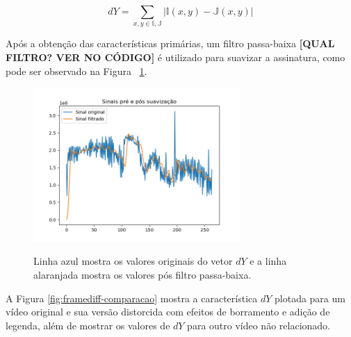 \begin{equation}
	\label{eq:framediff}
	dY = \sum_{x,y \in  \mathbb{I,J}} |\mathbb{I}(x,y) - \mathbb{J}(x,y)|
\end{equation} 

   Após a obtenção das características primárias, um filtro passa-baixa \textbf{[QUAL FILTRO? VER NO CÓDIGO]} é utilizado para suavizar a assinatura, como pode ser observado na Figura ~\ref{fig:framediff-passa-baixa}. %




\begin{figure}[h]
\centering
	\caption{Linha azul mostra os valores originais do vetor $dY$ e a linha alaranjada mostra os valores pós filtro passa-baixa.}
  	\includegraphics[width=0.7\textwidth]{dados/figuras/filtro_passa_baixa}
  \label{fig:framediff-passa-baixa}
\end{figure}


A Figura \ref{fig:framediff-comparacao} mostra a característica $dY$ plotada para um vídeo original e sua versão distorcida com efeitos de borramento e adição de legenda, além de mostrar os valores de $dY$ para outro vídeo não relacionado.

